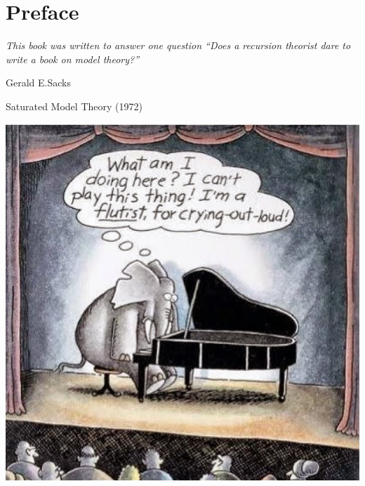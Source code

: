 \documentclass[creche.tex]{subfiles}
\begin{document}
\chapter*{Preface}



\begin{minipage}{0.5\textwidth}\sl
This book was written to answer one question ``Does a recursion theorist dare to write a book on model theory?''

\hfill Gerald E.\@ Sacks

\hfill Saturated Model Theory (1972)
\vspace*{10ex}
\end{minipage}
\hfill
\begin{minipage}{0.45\textwidth}\sl
\includegraphics[width=.99\textwidth]{elephant_playing_piano.jpg}
\end{minipage}
\medskip

\label{praface}

% 
% 
%
\end{document}
